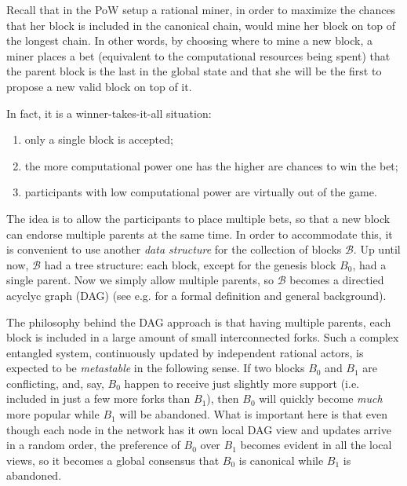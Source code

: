 \documentclass[a4paper]{article}
\begin{document}
Recall that in the PoW setup a rational miner, in order to maximize the chances that her block is included in the canonical chain, would mine her block on top of the longest chain. In other words, by choosing where to mine a new block, a miner places a bet (equivalent to the computational resources being spent) that the parent block is the last in the global state and that she will be the first to propose a new valid block on top of it.

In fact, it is a winner-takes-it-all situation: 
\begin{enumerate}
\item only a single block is accepted;
\item the more computational power one has the higher are chances to win the bet;
\item participants with low computational power are virtually out of the game.
\end{enumerate}

The idea is to allow the participants to place multiple bets, so that a new block can endorse multiple parents at the same time. In order to accommodate this, it is convenient to use another \emph{data structure} for the collection of blocks $\mathcal{B}$. Up until now, $\mathcal{B}$ had a tree structure: each block, except for the genesis block $B_0$, had a single parent. Now we simply allow multiple parents, so $\mathcal{B}$ becomes a directied acyclyc graph (DAG) (see e.g. \cite{DAGwiki} for a formal definition and general background).

The philosophy behind the DAG approach is that having multiple parents, each block is included in a large amount of small interconnected forks. Such a complex entangled system, continuously updated by independent rational actors, is expected to be \emph{metastable} in the following sense. If two  blocks $B_0$ and $B_1$ are conflicting, 
and, say, $B_0$ happen to receive just slightly more support (i.e. included in just a few more forks than $B_1$), then $B_0$ will quickly become \emph{much} more popular while $B_1$ will be abandoned. What is important here is that even though each node in the network has it own local DAG view and updates arrive in a random order, the preference of $B_0$ over $B_1$ becomes evident in all the local views, so it becomes a global consensus that $B_0$ is canonical while $B_1$ is abandoned. 
\end{document}
